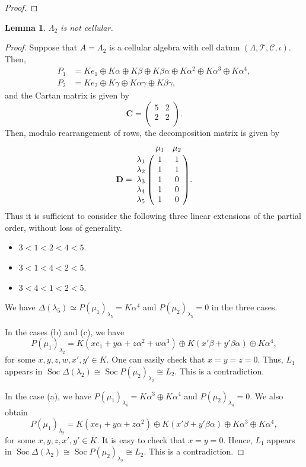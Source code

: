 \documentclass[12pt]{amsart}
\newtheorem{lem}[thm]{Lemma}
\numberwithin{equation}{thm}
\newcommand\bC{\mathbf C}
\newcommand\bD{\mathbf D}
\newcommand\cC{\mathcal{C}}
\newcommand\cT{\mathcal{T}}
\newcommand\la{\lambda}
\newcommand\Soc{\operatorname{Soc}}
\begin{document}
{\begin{proof}
\end{proof}
\begin{lem}
$\Lambda_2$ is not cellular.
\end{lem}
\begin{proof}
Suppose that $A=\Lambda_2$ is a cellular algebra with cell datum $(\Lambda,\cT,\cC,\iota)$. Then,
\begin{align*}
P_1 &=
Ke_1\oplus K\alpha\oplus K\beta\oplus K\beta\alpha\oplus K\alpha^2\oplus K\alpha^3\oplus K\alpha^4, \\
P_2 &=
Ke_2\oplus K\gamma\oplus K\alpha\gamma\oplus K\beta\gamma,
\end{align*}
and the Cartan matrix is given by
\[ \bC=\begin{pmatrix}
5 & 2 \\
2 & 2\\
\end{pmatrix}. \]
Then, modulo rearrangement of rows, the decomposition matrix is given by
  \[\bD=\bordermatrix{
& \mu_1 & \mu_2 \cr
\lambda_1 & 1 & 1 \cr
\lambda_2 & 1 & 1 \cr
\lambda_3 & 1 & 0 \cr
\lambda_4 & 1 & 0 \cr
\lambda_5 & 1 & 0 \cr
}. 
\]
Thus it is sufficient to consider the following three linear extensions of the partial order, 
without loss of generality.
\begin{itemize}
\item[(a)] $3<1<2<4<5$. 
\item[(b)] $3<1<4<2<5$. 
\item[(c)] $3<4<1<2<5$.
\end{itemize}
We have $\Delta(\lambda_5)\simeq P(\mu_1)_{\lambda_5}=K \alpha^4$
and $P(\mu_2)_{\lambda_5}=0$ in the three cases.
  
In the cases (b) and (c), we have
\[P(\mu_1)_{\lambda_2}=
K(xe_1+y\alpha+z\alpha^2+w\alpha^3)\oplus K(x'\beta+y'\beta\alpha)\oplus K\alpha^4,\]
for some $x,y,z,w,x',y'\in K$.
One can easily check that $x=y=z=0$.
Thus, $L_1$ appears in $\Soc \Delta(\lambda_2)\cong \Soc P(\mu_2)_{\la_2}\cong L_2$.
This is a contradiction.

In the case (a), we have $P(\mu_1)_{\lambda_4}=K\alpha^3\oplus K\alpha^4$
 and $P(\mu_2)_{\lambda_4}=0$. We also obtain
\[P(\mu_1)_{\lambda_2}=K(xe_1+y\alpha+z\alpha^2)
\oplus K(x'\beta+y'\beta\alpha)\oplus K\alpha^3\oplus K\alpha^4,\]
for some $x,y,z,x',y'\in K$.
It is easy to check that $x=y=0$. Hence, $L_1$ appears in 
$\Soc \Delta(\lambda_2)\cong \Soc P(\mu_2)_{\lambda_2}\cong L_2$.
This is a contradiction.
\end{proof}


}
\end{document}
